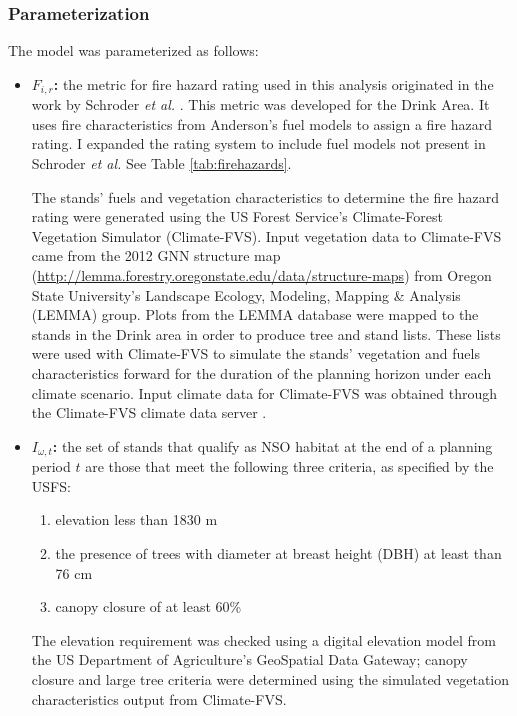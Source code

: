 \subsubsection{Parameterization}
The model was parameterized as follows:
\begin{itemize}
\item \textbf{$F_{i,r}$:} the metric for fire hazard rating used in this analysis originated in the work by Schroder \textit{et al.} \cite{schroder2016multi}. This metric was developed for the Drink Area. It uses fire characteristics from Anderson's fuel models \cite{anderson1982aids} to assign a fire hazard rating. I expanded the rating system to include fuel models not present in Schroder \textit{et al.} See Table \ref{tab:firehazards}.

The stands' fuels and vegetation characteristics to determine the fire hazard rating were generated using the US Forest Service's Climate-Forest Vegetation Simulator (Climate-FVS). Input vegetation data to Climate-FVS came from the 2012 GNN structure map (\url{http://lemma.forestry.oregonstate.edu/data/structure-maps}) from Oregon State University's Landscape Ecology, Modeling, Mapping \& Analysis (LEMMA) group. Plots from the LEMMA database were mapped to the stands in the Drink area in order to produce tree and stand lists. These lists were used with Climate-FVS to simulate the stands' vegetation and fuels characteristics forward for the duration of the planning horizon under each climate scenario. Input climate data for Climate-FVS was obtained through the Climate-FVS climate data server \cite{climateFVSReadyData}.
\item \textbf{$I_{\omega,t}$:} the set of stands that qualify as NSO habitat at the end of a planning period $t$ are those that meet the following three criteria, as specified by the USFS:
	\begin{enumerate}
	\item elevation less than 1830 m
	\item the presence of trees with diameter at breast height (DBH) at least than 76 cm
	\item canopy closure of at least 60\%
	\end{enumerate}
The elevation requirement was checked using a digital elevation model from the US Department of Agriculture's GeoSpatial Data Gateway; canopy closure and large tree criteria were determined using the simulated vegetation characteristics output from Climate-FVS.


\end{itemize}
